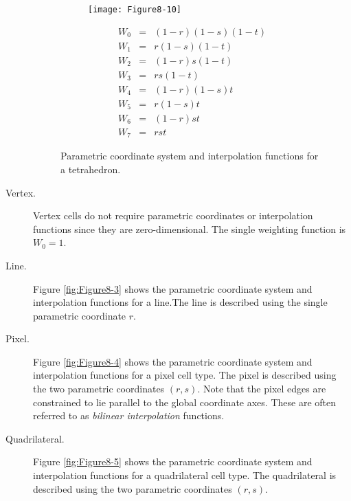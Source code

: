 \begin{description}
    \begin{figure}[!htb]
        \centering
        \begin{subfigure}{0.48\linewidth}
            \centering
            \texttt{[image: Figure8-10]}
            \caption*{}
        \end{subfigure}
        \hfill
        \begin{subfigure}{0.48\linewidth}
            \centering
            \begin{equation*}
            \begin{array}{lll}
            W_0 &=& (1 - r)(1 - s)(1 - t) \\
            W_1 &=& r (1-s)(1 -t) \\
            W_2 &=& (1-r)s(1-t) \\
            W_3 &=& rs(1 - t) \\
            W_4 &=& (1 - r)(1 - s) t \\
            W_5 &=& r (1-s)t \\
            W_6 &=& (1 - r)s t \\
            W_7 &=& r s t
            \end{array}
            \end{equation*}
        \end{subfigure}%
        \caption{Parametric coordinate system and interpolation functions for a tetrahedron.}
        \label{fig:Figure8-10}
    \end{figure}

    \item[Vertex.] Vertex cells do not require parametric coordinates or interpolation functions since they are zero-dimensional. The single weighting function is $W_0 = 1$.

    \item[Line.] Figure \ref{fig:Figure8-3} shows the parametric coordinate system and interpolation functions for a line.The line is described using the single parametric coordinate $r$.

    \item[Pixel.] Figure \ref{fig:Figure8-4} shows the parametric coordinate system and interpolation functions for a pixel cell type. The pixel is described using the two parametric coordinates $(r,s)$. Note that the pixel edges are constrained to lie parallel to the global coordinate axes. These are often referred to as \emph{bilinear interpolation} functions.

    \item[Quadrilateral.] Figure \ref{fig:Figure8-5} shows the parametric coordinate system and interpolation functions for a quadrilateral cell type. The quadrilateral is described using the two parametric coordinates $(r,s)$.


\end{description}
